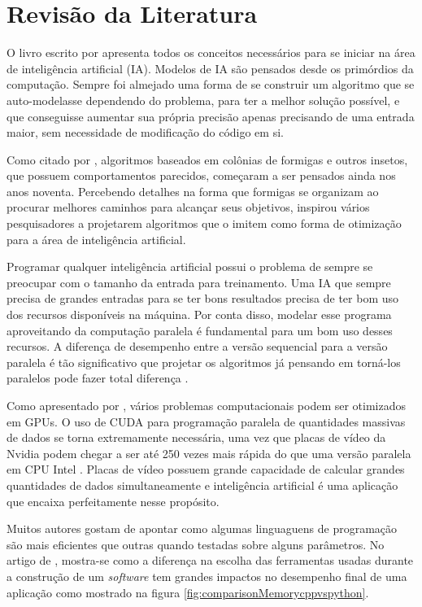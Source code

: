 \section{Revisão da Literatura}

O livro escrito por \citeauthor{BookIA} \cite{BookIA} apresenta todos os conceitos necessários para se iniciar na área de inteligência artificial (IA).
Modelos de IA são pensados desde os primórdios da computação. Sempre foi almejado uma forma de se construir um algoritmo
que se auto-modelasse dependendo do problema, para ter a melhor solução possível,
e que conseguisse aumentar sua própria precisão apenas precisando de uma entrada maior, sem necessidade de modificação
do código em si.

Como citado por \citeauthor{AntColonyOptimization} \cite{AntColonyOptimization}, algoritmos baseados em colônias de formigas
e outros insetos, que possuem comportamentos parecidos, começaram a ser pensados ainda nos anos noventa. 
Percebendo detalhes na forma que formigas se organizam ao procurar melhores
caminhos para alcançar seus objetivos, inspirou vários pesquisadores a projetarem algoritmos que o imitem como forma
de otimização para a área de inteligência artificial.

Programar qualquer inteligência artificial possui o problema de sempre se preocupar com o tamanho da entrada para treinamento.
Uma IA que sempre precisa de grandes entradas para se ter bons resultados precisa de ter bom uso dos recursos disponíveis na máquina. 
Por conta disso, modelar esse programa aproveitando da computação paralela é fundamental para um bom uso desses recursos. 
A diferença de desempenho entre a versão sequencial para a versão paralela é tão significativo que projetar os algoritmos 
já pensando em torná-los paralelos pode fazer total diferença \cite{SequentialVSParallel}.

Como apresentado por \citeauthor{ParallelComputingCUDA}, vários problemas computacionais podem ser otimizados em GPUs.
O uso de CUDA para programação paralela de quantidades massivas de dados se torna extremamente necessária, uma vez que
placas de vídeo da Nvidia podem chegar a ser até 250 vezes mais rápida do que uma versão paralela em CPU Intel \cite{ParallelComputingCUDA}. 
Placas de vídeo possuem grande capacidade de calcular grandes quantidades de dados simultaneamente e inteligência artificial 
é uma aplicação que encaixa perfeitamente nesse propósito.

Muitos autores gostam de apontar como algumas linguaguens de programação são mais eficientes que outras 
quando testadas sobre alguns parâmetros.
No artigo  de \citeauthor{C++vsPython}, mostra-se como a diferença na escolha das ferramentas
usadas durante a construção de um \emph{software} tem grandes impactos no desempenho final de uma aplicação como
mostrado na figura \ref{fig:comparisonMemorycppvspython}.

